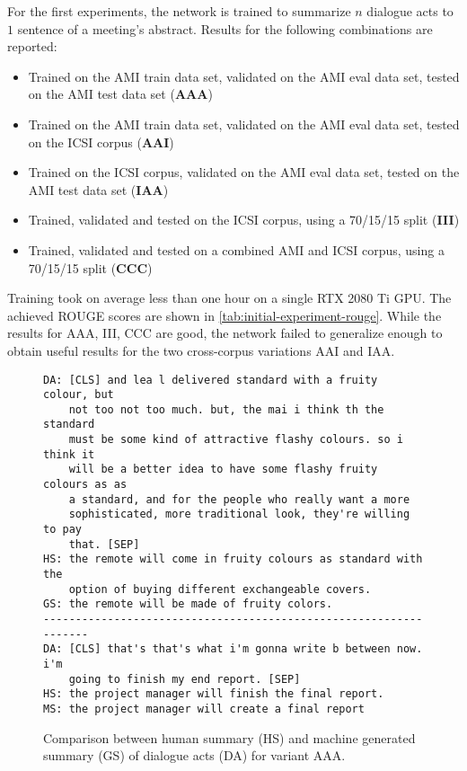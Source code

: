 For the first experiments, the network is trained to summarize $n$ dialogue acts to $1$ sentence of a meeting's abstract.
Results for the following combinations are reported:

\begin{itemize}
\item Trained on the AMI train data set, validated on the AMI eval data set, tested on the AMI test data set (\textbf{AAA})
\item Trained on the AMI train data set, validated on the AMI eval data set, tested on the ICSI corpus (\textbf{AAI})
\item Trained on the ICSI corpus, validated on the AMI eval data set, tested on the AMI test data set (\textbf{IAA})
\item Trained, validated and tested on the ICSI corpus, using a 70/15/15 split (\textbf{III})
\item Trained, validated and tested on a combined AMI and ICSI corpus, using a 70/15/15 split (\textbf{CCC})
\end{itemize}

Training took on average less than one hour on a single RTX 2080 Ti GPU.
The achieved ROUGE scores are shown in \cref{tab:initial-experiment-rouge}.
While the results for AAA, III, CCC are good, the network failed to generalize enough to obtain useful results for the two cross-corpus variations AAI and IAA.

\begin{figure}[h]
\begin{lstlisting}[numbers=none]
DA: [CLS] and lea l delivered standard with a fruity colour, but
    not too not too much. but, the mai i think th the standard
    must be some kind of attractive flashy colours. so i think it
    will be a better idea to have some flashy fruity colours as as
    a standard, and for the people who really want a more
    sophisticated, more traditional look, they're willing to pay
    that. [SEP]
HS: the remote will come in fruity colours as standard with the
    option of buying different exchangeable covers.
GS: the remote will be made of fruity colors.
------------------------------------------------------------------
DA: [CLS] that's that's what i'm gonna write b between now. i'm
    going to finish my end report. [SEP]
HS: the project manager will finish the final report.
MS: the project manager will create a final report
\end{lstlisting}
\caption{Comparison between human summary (HS) and machine generated summary (GS) of dialogue acts (DA) for variant AAA.}
\label{fig:initial-experiment-example}
\end{figure}

